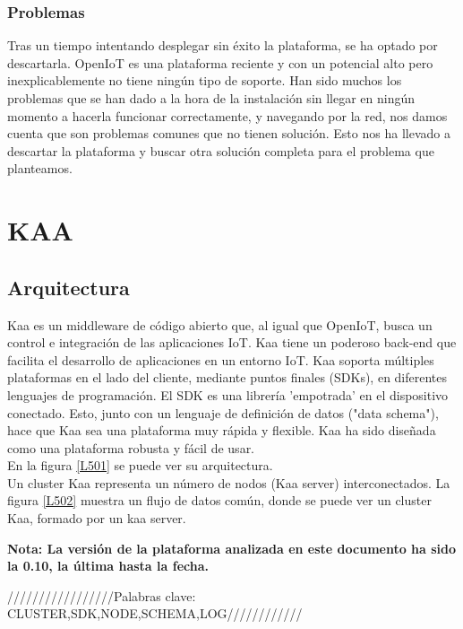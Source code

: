 \documentclass[12pt, twoside]{book}
\begin{document}
\subsection{Problemas}
Tras un tiempo intentando desplegar sin éxito la plataforma, se ha optado por descartarla. OpenIoT es una plataforma reciente y con un potencial alto pero inexplicablemente no tiene ningún tipo de soporte. Han sido muchos los problemas que se han dado a la hora de la instalación sin llegar en ningún momento a hacerla funcionar correctamente, y navegando por la red, nos damos cuenta que son problemas comunes que no tienen solución. Esto nos ha llevado a descartar la plataforma y buscar otra solución completa para el problema que planteamos.
\chapter{KAA}
\section{Arquitectura}
Kaa es un middleware de código abierto que, al igual que OpenIoT, busca un control e integración de las aplicaciones IoT. Kaa tiene un poderoso back-end que facilita el desarrollo de aplicaciones en un entorno IoT. Kaa soporta múltiples plataformas en el lado del cliente, mediante puntos finales (SDKs), en diferentes lenguajes de programación. El SDK es una librería 'empotrada' en el dispositivo conectado. Esto, junto con un lenguaje de definición de datos ("data schema"), hace que Kaa sea una plataforma muy rápida y flexible. Kaa ha sido diseñada como una plataforma robusta y fácil de usar.\\ En la figura \ref{L501} se puede ver su arquitectura.\\
Un cluster Kaa representa un número de nodos (Kaa server) interconectados. La figura \ref{L502} muestra un flujo de datos común, donde se puede ver un cluster Kaa, formado por un kaa server.  



\textbf{Nota: La versión de la plataforma analizada en este documento ha sido la 0.10, la última hasta la fecha.}

/////////////////Palabras clave: CLUSTER,SDK,NODE,SCHEMA,LOG////////////\\
\end{document}
